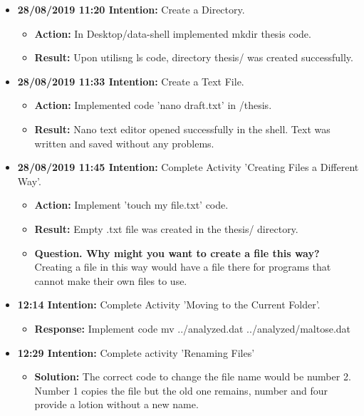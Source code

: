 \documentclass{article}
\begin{document}
\begin{itemize}

\item{\textbf{28/08/2019 11:20 Intention:} Create a Directory.}
\begin{itemize}
\item{\textbf{Action:} In Desktop/data-shell implemented mkdir thesis code.}
\item{\textbf{Result:} Upon utilisng ls code, directory thesis/ was created successfully.}

\end{itemize}

\item{\textbf{28/08/2019 11:33 Intention:} Create a Text File.}
\begin{itemize} 

\item{\textbf{Action:} Implemented code 'nano draft.txt' in /thesis.}
\item{\textbf{Result:} Nano text editor opened successfully in the shell. Text was written and saved without any problems.}

\end{itemize}

\item{\textbf{28/08/2019 11:45 Intention:} Complete Activity 'Creating Files a Different Way'.}
\begin{itemize}
\item{\textbf{Action:} Implement 'touch my file.txt' code.}
\item{\textbf{Result:} Empty .txt file was created in the thesis/ directory.}
\item{\textbf{Question. Why might you want to create a file this way?} Creating a file in this way would have a file there for programs that cannot make their own files to use.}

\end{itemize}

\item{\textbf{12:14 Intention:} Complete Activity 'Moving to the Current Folder'.}

\begin{itemize}

\item{\textbf{Response:} Implement code mv ../analyzed.dat ../analyzed/maltose.dat}
\end{itemize}

\item{\textbf{12:29 Intention:} Complete activity 'Renaming Files'}
\begin{itemize}
\item{\textbf{Solution:}  The correct code to change the file name would be number 2. Number 1 copies the file but the old one remains, number and four provide a lotion without a new name. } 
\end{itemize}


\end{itemize}
\end{document}
